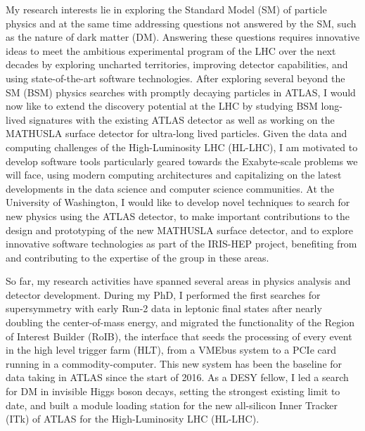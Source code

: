\documentclass[a4paper]{article}
\begin{document}
\thispagestyle{fancy} 
 \lfoot{} \rfoot{\bf \thepage} \cfoot{}

\fontsize{11}{14}
\selectfont

My research interests lie in exploring the Standard Model (SM) of particle physics and at the same time addressing questions not answered by the SM, such as the nature of dark matter (DM). Answering these questions requires innovative ideas to meet the ambitious experimental program of the LHC over the next decades by exploring uncharted territories, improving detector capabilities, and using state-of-the-art software technologies. After exploring several beyond the SM (BSM) physics searches with promptly decaying particles in ATLAS, I would now like to extend the discovery potential at the LHC by studying BSM long-lived signatures with the existing ATLAS detector as well as working on the MATHUSLA surface detector for ultra-long lived particles. Given the data and computing challenges of the High-Luminosity LHC (HL-LHC), I am motivated to develop software tools particularly
geared towards the Exabyte-scale problems we will face, using modern computing architectures and capitalizing on the latest developments in the data science and computer science communities. At the University of Washington, I would like to develop novel techniques to search for new physics using the ATLAS detector, to make important contributions to the design and prototyping of the new MATHUSLA surface detector, and to explore innovative software technologies as part of the IRIS-HEP project, benefiting from and contributing to the expertise of the group in these areas.

\bigskip

So far, my research activities have spanned several areas in physics analysis and detector development. During my PhD, I performed the first searches for supersymmetry with early Run-2 data in leptonic final states after nearly doubling the center-of-mass energy, and migrated the functionality of the Region of Interest Builder (RoIB), the interface that seeds the processing of every event in the high level trigger farm (HLT), from a VMEbus system to a PCIe card running in a commodity-computer. This new system has been the baseline for data taking in ATLAS since the start of 2016. As a DESY fellow, I led a search for DM in invisible Higgs boson decays, setting the strongest existing limit to date, and built a module loading station for the new all-silicon Inner Tracker (ITk) of ATLAS for the High-Luminosity LHC (HL-LHC).
\end{document}
